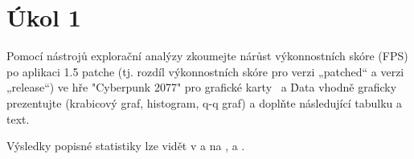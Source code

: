 \section*{Úkol 1}
\label{sec:task-1}

Pomocí nástrojů explorační analýzy zkoumejte nárůst výkonnostních skóre (FPS) po aplikaci 1.5 patche 
(tj. rozdíl výkonnostních skóre pro verzi „patched“ a verzi „release“) ve hře "Cyberpunk 2077" pro grafické karty 
\nvidiaCardTri\ a \amdCardSedm\. Data vhodně graficky prezentujte (krabicový graf, histogram, q-q graf)
a doplňte následující tabulku a text.

\vspace{2em}
\noindent
Výsledky popisné statistiky lze vidět v  a na  ,  a .

\newcommand{\rangeValues}       {70,        59,         69,         58}
\newcommand{\minValues}         {-4.8,      4.2,        5.1,        4.2}
\newcommand{\QfValues}          {5.425,     4.900,      5.500,      4.900}
\newcommand{\medianValues}      {5.700,     5.300,      5.700,      5.300}
\newcommand{\meanValues}        {5.600,     5.371,      5.750,      5.191}
\newcommand{\QtValues}          {6.100,     5.550,      6.100,      5.500}
\newcommand{\maxValues}         {6.6,       15.8,       6.6,        5.9}
\newcommand{\sdValues}          {1.335,     1.452,      0.439,      0.451}
\newcommand{\cvValues}          {23.8,      27.0,       7.6,        8.7}
\newcommand{\skewnessValues}    {-6.9,      6.4,        0.2,        -0.4}
\newcommand{\kurtosisValues}    {51.3,      43.8,       -1.0,       -0.7}
\newcommand{\lowerBoundValues}  {4.41,      3.92,       0,          0}
\newcommand{\upperBoundValues}  {7.11,      6.52,       0,          0}

\newcommand{\sigmaValues} {4.873, 6.628, 4.289, 6.093}

\newcommand{\tableValue}[2]{%
    \pgfmathparse{{#1}[#2]}%
    \edef\tempResult{\pgfmathresult}%
    \ifnum\pdfstrcmp{\tempResult}{inf}=0 %
        $\infty$%
    \else%
        \mbox{\tempResult}%
    \fi%
}

\newcommand{\nvidiaCardDva}{Nvidia RTX 2080 Ti}
\newcommand{\nvidiaCardTri}{Nvidia RTX 3070 Ti}
\newcommand{\amdCardSest}  {AMD Radeon RX 6800 XT}
\newcommand{\amdCardSedm}  {AMD Radeon RX 7700 XT}

